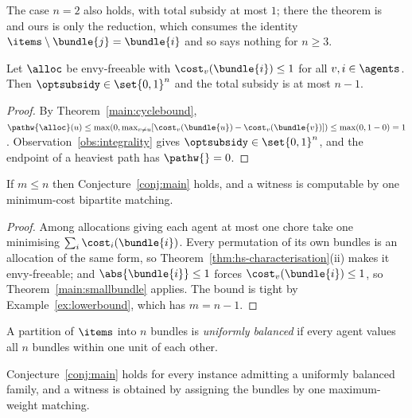 The case $n = 2$ also holds, with total subsidy at most $1$; there the theorem
is~\cite[Theorem~4]{BKNS22} and ours is only the reduction, which consumes the
identity $\items \setminus \bundle{j} = \bundle{i}$ and so says nothing for
$n \ge 3$.

\begin{theorem}
\label{main:smallbundle}
Let $\alloc$ be envy-freeable with $\cost_v(\bundle{i}) \le 1$ for all
$v, i \in \agents$. Then $\optsubsidy \in \set{0,1}^n$ and the total subsidy is
at most $n-1$.
\end{theorem}

\begin{proof}
By Theorem~\ref{main:cyclebound}, $\pathw{\alloc}(u) \le \max(0, \max_{v \ne u}
[\cost_v(\bundle{u}) - \cost_v(\bundle{v})]) \le \max(0, 1-0) = 1$.
Observation~\ref{obs:integrality} gives $\optsubsidy \in \set{0,1}^n$, and the
endpoint of a heaviest path has $\pathw{} = 0$.
\end{proof}

\begin{corollary}
\label{main:m-le-n}
If $m \le n$ then Conjecture~\ref{conj:main} holds, and a witness is computable
by one minimum-cost bipartite matching.
\end{corollary}

\begin{proof}
Among allocations giving each agent at most one chore take one minimising
$\sum_i \cost_i(\bundle{i})$. Every permutation of its own bundles is an
allocation of the same form, so Theorem~\ref{thm:hs-characterisation}(ii) makes
it envy-freeable; and $\abs{\bundle{i}} \le 1$ forces
$\cost_v(\bundle{i}) \le 1$, so Theorem~\ref{main:smallbundle} applies. The
bound is tight by Example~\ref{ex:lowerbound}, which has $m = n-1$.
\end{proof}

\begin{definition}
\label{main:unifbal}
A partition of $\items$ into $n$ bundles is \emph{uniformly balanced} if every
agent values all $n$ bundles within one unit of each other.
\end{definition}

\begin{theorem}
\label{main:balanced-class}
Conjecture~\ref{conj:main} holds for every instance admitting a uniformly
balanced family, and a witness is obtained by assigning the bundles by one
maximum-weight matching.
\end{theorem}

